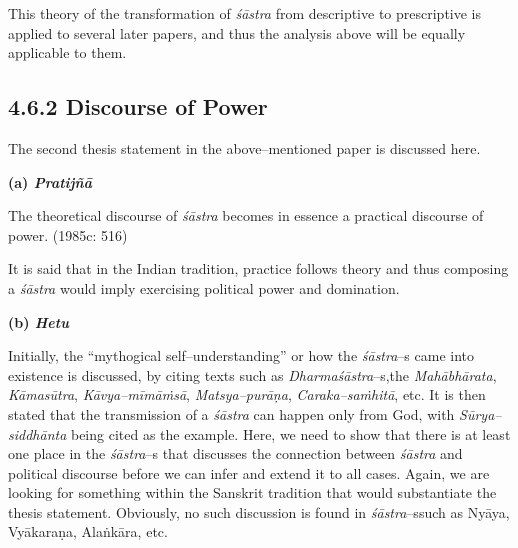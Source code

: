 This theory of the transformation of \textit{śāstra }from descriptive to prescriptive is applied to several later papers, and thus the analysis above will be equally applicable to them.

\vspace{-.3cm}

\subsection*{4.6.2 Discourse of Power}

\vspace{-.2cm}

The second thesis statement in the above–mentioned paper is discussed here.

\textbf{(a) \textit{Pratijñā }}

\begin{myquote}
The theoretical discourse of \textit{śāstra} becomes in essence a practical discourse of power. (1985c: 516)
\end{myquote}

It is said that in the Indian tradition, practice follows theory and thus composing a\textit{ śāstra }would imply exercising political power and domination.

\textbf{(b) \textit{Hetu}}

Initially, the “mythogical self–understanding” or how the \textit{śāstra}–s came into existence is discussed, by citing texts such as \textit{Dharmaśāstra}–s,\break the \textit{Mahābhārata}, \textit{Kāmasūtra}, \textit{Kāvya–mīmāṁsā}, \textit{Matsya–purāṇa}, \textit{Caraka–saṁhitā}, etc. It is then stated that the transmission of a \textit{śāstra} can happen only from God, with \textit{Sūrya–siddhānta} being cited as the example. Here, we need to show that there is at least one place in the\textit{ śāstra}–s that discusses the connection between \textit{śāstra} and political discourse before we can infer and extend it to all cases. Again, we are looking for something within the Sanskrit tradition that would substantiate the thesis statement. Obviously, no such discussion is found in \textit{śāstra}–s\break such as Nyāya, Vyākaraṇa, Alaṅkāra, etc.

